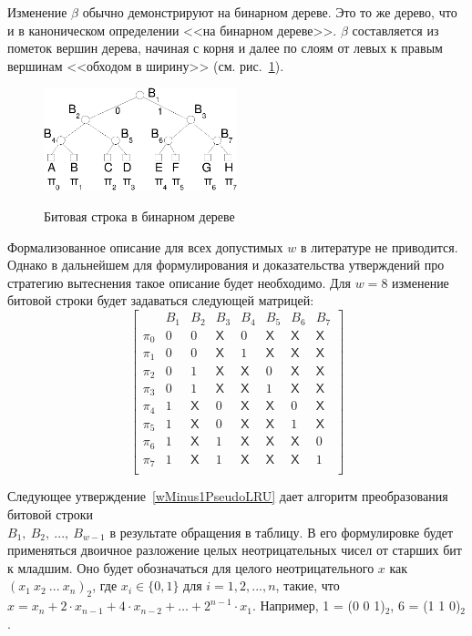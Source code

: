 \begin{enumerate}
Изменение $\beta$ обычно демонстрируют на бинарном дереве. Это то же дерево, что и в каноническом определении \PseudoLRU <<на бинарном дереве>>. $\beta$ составляется из пометок вершин дерева, начиная с корня и далее по слоям от левых к правым вершинам <<обходом в ширину>> (см. рис.~\ref{plru_bittree}).

\begin{figure}[h] \center
  \includegraphics[width=0.5\textwidth]{2.theor/plru}\\
  \caption{Битовая строка в бинарном дереве}\label{plru_bittree}
\end{figure}

Формализованное описание для всех допустимых $w$ в литературе не
приводится. Однако в дальнейшем для формулирования и доказательства
утверждений про стратегию вытеснения \PseudoLRU такое описание будет
необходимо. Для $w=8$ изменение битовой строки будет задаваться следующей матрицей:
$$
\left[
  \begin{array}{c|ccccccc}
          & B_1 & B_2 & B_3 & B_4 & B_5 & B_6 & B_7 \\ \hline
    \pi_0 & 0 & 0 & \textsf{X} & 0 & \textsf{X} & \textsf{X} & \textsf{X} \\
    \pi_1 & 0 & 0 & \textsf{X} & 1 & \textsf{X} & \textsf{X} & \textsf{X} \\
    \pi_2 & 0 & 1 & \textsf{X} & \textsf{X} & 0 & \textsf{X} & \textsf{X} \\
    \pi_3 & 0 & 1 & \textsf{X} & \textsf{X} & 1 & \textsf{X} & \textsf{X} \\
    \pi_4 & 1 & \textsf{X} & 0 & \textsf{X} & \textsf{X} & 0 & \textsf{X} \\
    \pi_5 & 1 & \textsf{X} & 0 & \textsf{X} & \textsf{X} & 1 & \textsf{X} \\
    \pi_6 & 1 & \textsf{X} & 1 & \textsf{X} & \textsf{X} & \textsf{X} & 0 \\
    \pi_7 & 1 & \textsf{X} & 1 & \textsf{X} & \textsf{X} & \textsf{X} & 1 \\
  \end{array}
\right]
$$

Следующее утверждение~\ref{wMinus1PseudoLRU} дает алгоритм
преобразования битовой строки\\ $B_1,~B_2,~...,~B_{w{-}1}$ в результате
обращения в таблицу. В его формулировке будет применяться двоичное
разложение целых неотрицательных чисел от старших бит к младшим. Оно будет обозначаться для целого неотрицательного $x$ как $(x_1~x_2~...~x_n)_2$, где $x_i \in \{0, 1\}$ для $i = 1, 2, ..., n$, такие, что $x = x_n + 2{\cdot}x_{n-1} + 4{\cdot}x_{n-2} + \dots + 2^{n-1}{\cdot}x_1$. Например, 1 = (0 0 1)$_2$, 6 = (1 1 0)$_2$.


\end{enumerate}
